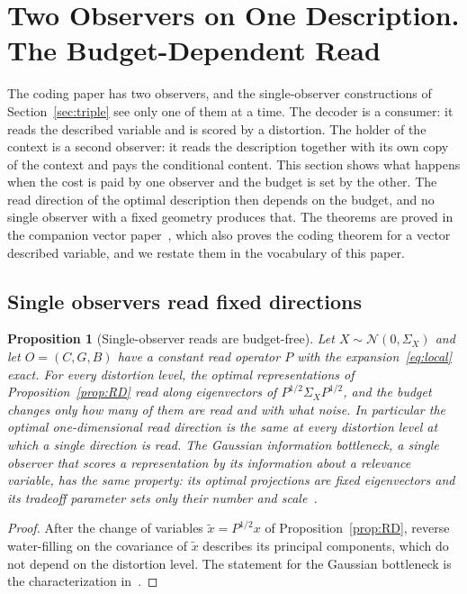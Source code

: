 \documentclass[11pt]{article}
\newtheorem{proposition}{Proposition}
\theoremstyle{definition}
\theoremstyle{remark}
\begin{document}
\section{Two Observers on One Description. The Budget-Dependent Read}
\label{sec:twoobs}

The coding paper has two observers, and the single-observer constructions of Section~\ref{sec:triple} see only one of them at a time.
The decoder is a consumer: it reads the described variable and is scored by a distortion.
The holder of the context is a second observer: it reads the description together with its own copy of the context and pays the conditional content.
This section shows what happens when the cost is paid by one observer and the budget is set by the other.
The read direction of the optimal description then depends on the budget, and no single observer with a fixed geometry produces that.
The theorems are proved in the companion vector paper~\cite{bond2026vector}, which also proves the coding theorem for a vector described variable, and we restate them in the vocabulary of this paper.

\subsection{Single observers read fixed directions}

\begin{proposition}[Single-observer reads are budget-free]
\label{prop:fixedread}
Let $X\sim\mathcal{N}(0,\Sigma_{X})$ and let $O=(C,G,B)$ have a constant read operator $P$ with the expansion~\eqref{eq:local} exact.
For every distortion level, the optimal representations of Proposition~\ref{prop:RD} read along eigenvectors of $P^{1/2}\Sigma_{X}P^{1/2}$, and the budget changes only how many of them are read and with what noise.
In particular the optimal one-dimensional read direction is the same at every distortion level at which a single direction is read.
The Gaussian information bottleneck, a single observer that scores a representation by its information about a relevance variable, has the same property: its optimal projections are fixed eigenvectors and its tradeoff parameter sets only their number and scale~\cite{chechik2005}.
\end{proposition}

\begin{proof}
After the change of variables $\tilde{x}=P^{1/2}x$ of Proposition~\ref{prop:RD}, reverse water-filling on the covariance of $\tilde{x}$ describes its principal components, which do not depend on the distortion level.
The statement for the Gaussian bottleneck is the characterization in~\cite{chechik2005}.
\end{proof}
\end{document}
